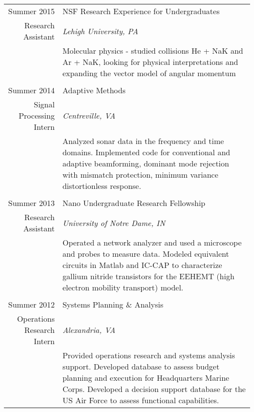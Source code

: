 \documentclass[a4paper,10pt]{article} %
\begin{document}
\begin{tabular}{r|p{12.5cm}}
Summer 2015 & NSF Research Experience for Undergraduates \\
Research Assistant & \emph{Lehigh University, PA}\\ 
& \footnotesize{Molecular physics - studied collisions He + NaK and Ar + NaK,
looking for physical interpretations and expanding the vector model of angular
momentum}\\
\multicolumn{2}{c}{} \\


Summer 2014 & Adaptive Methods \\
Signal Processing Intern & \emph{Centreville, VA}\\ 
& \footnotesize{Analyzed sonar data in the frequency and time domains.
Implemented code for conventional and adaptive beamforming, dominant mode
rejection with mismatch protection, minimum variance distortionless response.}\\
\multicolumn{2}{c}{} \\


Summer 2013 & Nano Undergraduate Research Fellowship \\
Research Assistant & \emph{University of Notre Dame, IN}\\ 
& \footnotesize{Operated a network analyzer and used a microscope and probes to
measure data. Modeled equivalent circuits in Matlab and IC-CAP to characterize gallium
nitride transistors for the EEHEMT (high electron mobility transport) model.}\\
\multicolumn{2}{c}{} \\


Summer 2012 & Systems Planning \& Analysis\\
Operations Research Intern & \emph{Alexandria, VA}\\ 
& \footnotesize{Provided operations research and systems analysis support. 
Developed database to assess budget planning and execution for Headquarters
Marine Corps. Developed a decision support database for the US Air Force to
assess functional capabilities.}\\
\end{tabular}
\end{document}
